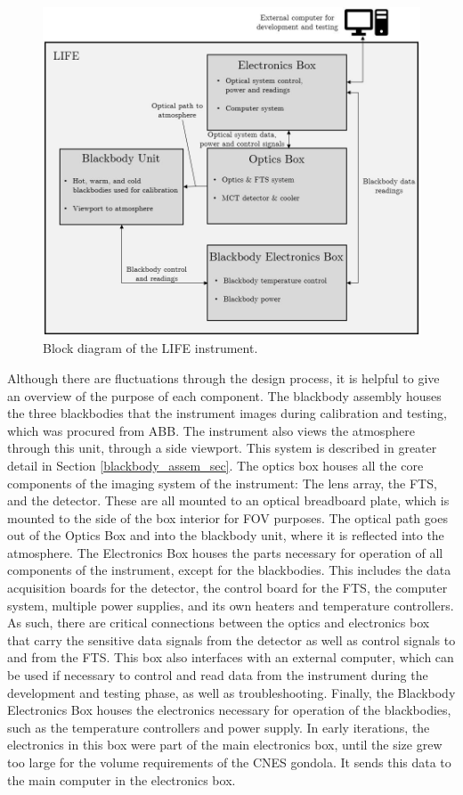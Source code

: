 \begin{figure}
    \centering
    \includegraphics[width=\linewidth]{chap3_images/LIFE_block_diagram.JPG}
    \caption{Block diagram of the LIFE instrument.}
    \label{fig:LIFE_block_diagram}
\end{figure}

Although there are fluctuations through the design process, it is helpful to give an overview of the purpose of each component. The blackbody assembly houses the three blackbodies that the instrument images during calibration and testing, which was procured from ABB. The instrument also views the atmosphere through this unit, through a side viewport. This system is described in greater detail in Section \ref{blackbody_assem_sec}. The optics box houses all the core components of the imaging system of the instrument: The lens array, the FTS, and the detector. These are all mounted to an optical breadboard plate, which is mounted to the side of the box interior for FOV purposes. The optical path goes out of the Optics Box and into the blackbody unit, where it is reflected into the atmosphere. The Electronics Box houses the parts necessary for operation of all components of the instrument, except for the blackbodies. This includes the data acquisition boards for the detector, the control board for the FTS, the computer system, multiple power supplies, and its own heaters and temperature controllers. As such, there are critical connections between the optics and electronics box that carry the sensitive data signals from the detector as well as control signals to and from the FTS. This box also interfaces with an external computer, which can be used if necessary to control and read data from the instrument during the development and testing phase, as well as troubleshooting. Finally, the Blackbody Electronics Box houses the electronics necessary for operation of the blackbodies, such as the temperature controllers and power supply. In early iterations, the electronics in this box were part of the main electronics box, until the size grew too large for the volume requirements of the CNES gondola. It sends this data to the main computer in the electronics box.

